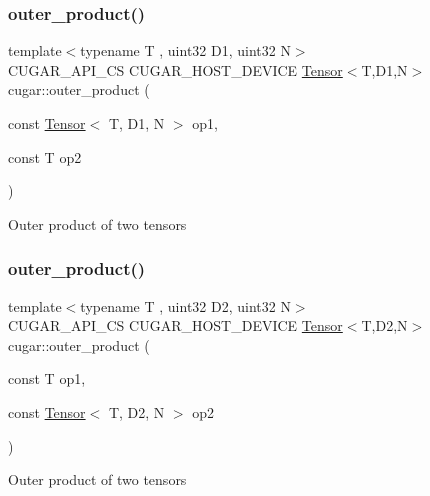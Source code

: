 \subsubsection{\texorpdfstring{outer\+\_\+product()}{outer\_product()}\hspace{0.1cm}{\footnotesize\ttfamily [5/9]}}
{\footnotesize\ttfamily template$<$typename T , uint32 D1, uint32 N$>$ \\
C\+U\+G\+A\+R\+\_\+\+A\+P\+I\+\_\+\+CS C\+U\+G\+A\+R\+\_\+\+H\+O\+S\+T\+\_\+\+D\+E\+V\+I\+CE \hyperlink{structcugar_1_1_tensor}{Tensor}$<$T,D1,N$>$ cugar\+::outer\+\_\+product (\begin{DoxyParamCaption}\item[{const \hyperlink{structcugar_1_1_tensor}{Tensor}$<$ T, D1, N $>$}]{op1,  }\item[{const T}]{op2 }\end{DoxyParamCaption})}

Outer product of two tensors \mbox{\label{namespacecugar_adba86f3dd826f0547a2af557817b08a7}} 
\subsubsection{\texorpdfstring{outer\+\_\+product()}{outer\_product()}\hspace{0.1cm}{\footnotesize\ttfamily [6/9]}}
{\footnotesize\ttfamily template$<$typename T , uint32 D2, uint32 N$>$ \\
C\+U\+G\+A\+R\+\_\+\+A\+P\+I\+\_\+\+CS C\+U\+G\+A\+R\+\_\+\+H\+O\+S\+T\+\_\+\+D\+E\+V\+I\+CE \hyperlink{structcugar_1_1_tensor}{Tensor}$<$T,D2,N$>$ cugar\+::outer\+\_\+product (\begin{DoxyParamCaption}\item[{const T}]{op1,  }\item[{const \hyperlink{structcugar_1_1_tensor}{Tensor}$<$ T, D2, N $>$}]{op2 }\end{DoxyParamCaption})}

Outer product of two tensors \mbox{\label{namespacecugar_ab7ff6cecff7379e980468f2962c32121}} 
